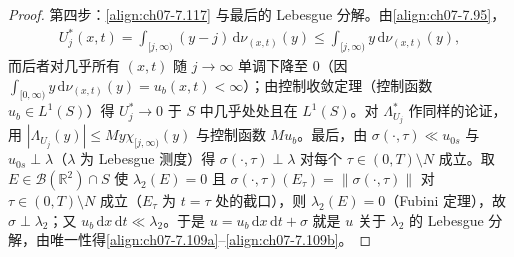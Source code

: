 \documentclass[../../main.tex]{subfiles}%
\begin{document}
\begin{proof}
第四步：\eqref{align:ch07-7.117} 与最后的 Lebesgue 分解。由\eqref{align:ch07-7.95}，
\begin{align*}
U_j^*(x,t)=\int_{[j,\infty)}(y-j)\,\mathrm{d}\nu_{(x,t)}(y)\leqslant\int_{[j,\infty)}y\,\mathrm{d}\nu_{(x,t)}(y),
\end{align*}
而后者对几乎所有 $(x,t)$ 随 $j\to\infty$ 单调下降至 $0$（因 $\int_{[0,\infty)}y\,\mathrm{d}\nu_{(x,t)}(y)=u_b(x,t)<\infty$）；由控制收敛定理（控制函数 $u_b\in L^1(S)$）得 $U_j^*\to0$ 于 $S$ 中几乎处处且在 $L^1(S)$。对 $\Lambda_{U_j}^*$ 作同样的论证，用 $|\Lambda_{U_j}(y)|\leqslant My\chi_{[j,\infty)}(y)$ 与控制函数 $Mu_b$。最后，由 $\sigma(\cdot,\tau)\ll u_{0s}$ 与 $u_{0s}\perp\lambda$（$\lambda$ 为 Lebesgue 测度）得 $\sigma(\cdot,\tau)\perp\lambda$ 对每个 $\tau\in(0,T)\setminus N$ 成立。取 $E\in\mathcal{B}(\mathbb{R}^2)\cap S$ 使 $\lambda_2(E)=0$ 且 $\sigma(\cdot,\tau)(E_\tau)=\|\sigma(\cdot,\tau)\|$ 对 $\tau\in(0,T)\setminus N$ 成立（$E_\tau$ 为 $t=\tau$ 处的截口），则 $\lambda_2(E)=0$（Fubini 定理），故 $\sigma\perp\lambda_2$；又 $u_b\,\mathrm{d}x\,\mathrm{d}t\ll\lambda_2$。于是 $u=u_b\,\mathrm{d}x\,\mathrm{d}t+\sigma$ 就是 $u$ 关于 $\lambda_2$ 的 Lebesgue 分解，由唯一性得\eqref{align:ch07-7.109a}--\eqref{align:ch07-7.109b}。
\end{proof}
\end{document}
